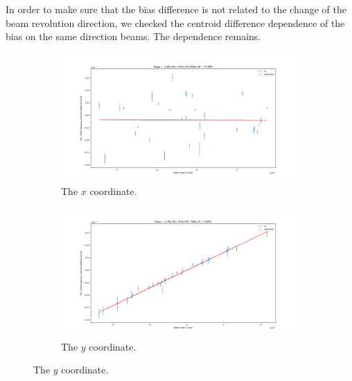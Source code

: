 \documentclass{article}
\begin{document}
In order to make sure that the bias difference is not related to the change of the beam revolution direction, we checked the centroid difference dependence of the bias on the same direction beams. The dependence remains.

\begin{figure}[!h]
  \centering
  \begin{subfigure}[b]{\linewidth}
    \includegraphics[width=\linewidth]{img/spin_axis_motion/freq_estimates_vs_centroid_diff_X}
    \caption{The $x$ coordinate.}
  \end{subfigure}
  \begin{subfigure}[b]{\linewidth}
    \includegraphics[width=\linewidth]{img/spin_axis_motion/freq_estimates_vs_centroid_diff_Y}
    \caption{The $y$ coordinate.}
  \end{subfigure}
\end{figure}
\end{document}

